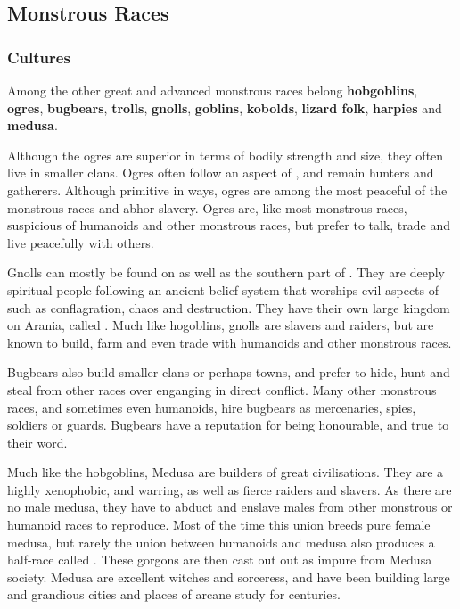 \subsection{Monstrous Races}
\label{sec:Monstrous Races}

\subsubsection{Cultures}

Among the other great and advanced monstrous races belong \textbf{hobgoblins},
\textbf{ogres}, \textbf{bugbears}, \textbf{trolls}, \textbf{gnolls},
\textbf{goblins}, \textbf{kobolds}, \textbf{lizard folk}, \textbf{harpies}
and \textbf{medusa}.

Although the ogres are superior in terms of bodily strength and size, they
often live in smaller clans. Ogres often follow an aspect of
, and remain hunters and gatherers. Although primitive
in ways, ogres are among the most peaceful of the monstrous races and abhor
slavery. Ogres are, like most monstrous races, suspicious of humanoids and
other monstrous races, but prefer to talk, trade and live peacefully with
others.

Gnolls can mostly be found on  as well as the southern
part of . They are deeply spiritual people following an
ancient belief system that worships evil aspects of  such
as conflagration, chaos and destruction. They have their own large kingdom on
Arania, called . Much like hogoblins, gnolls are slavers
and raiders, but are known to build, farm and even trade with humanoids and
other monstrous races.

Bugbears also build smaller clans or perhaps towns, and prefer to hide, hunt
and steal from other races over enganging in direct conflict. Many other
monstrous races, and sometimes even humanoids, hire bugbears as mercenaries,
spies, soldiers or guards. Bugbears have a reputation for being honourable,
and true to their word.

Much like the hobgoblins, Medusa are builders of great civilisations. They are
a highly xenophobic, and warring, as well as fierce raiders and slavers. As
there are no male medusa, they have to abduct and enslave males from other
monstrous or humanoid races to reproduce. Most of the time this union breeds
pure female medusa, but rarely the union between humanoids and medusa also
produces a half-race called . These gorgons are then cast
out out as impure from Medusa society. Medusa are excellent witches and
sorceress, and have been building large and grandious cities and places of
arcane study for centuries.

